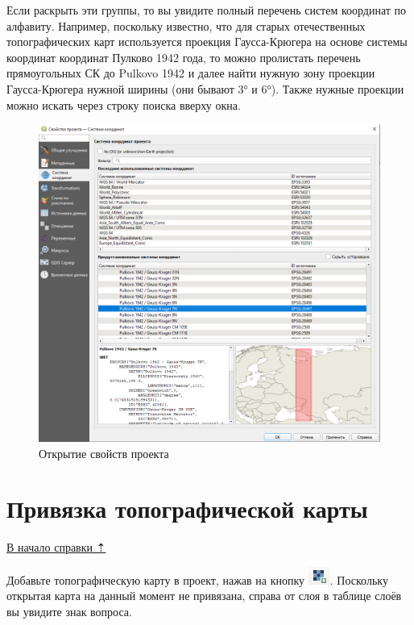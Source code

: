 \documentclass[
  12pt,
]{book}
\begin{document}
Если раскрыть эти группы, то вы увидите полный перечень систем координат по алфавиту. Например, поскольку известно, что для старых отечественных топографических карт используется проекция Гаусса-Крюгера на основе системы координат координат Пулково 1942 года, то можно пролистать перечень прямоугольных СК до Pulkovo 1942 и далее найти нужную зону проекции Гаусса-Крюгера нужной ширины (они бывают 3° и 6°). Также нужные проекции можно искать через строку поиска вверху окна.

\begin{figure}
\centering
\includegraphics{images/Georeference/Gauss_7N.png}
\caption{Открытие свойств проекта}
\end{figure}

\section{Привязка топографической карты}\label{georeference-topo}

\hyperref[georeference]{В начало справки ⇡}

Добавьте топографическую карту в проект, нажав на кнопку \includegraphics{images/Georeference/Open_raster.png}. Поскольку открытая карта на данный момент не привязана, справа от слоя в таблице слоёв вы увидите знак вопроса.
\end{document}
